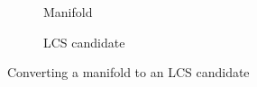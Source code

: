 \begin{figure}[htpb]
\centering
    \begin{subfigure}[b]{0.475\textwidth}
        \centering
        
        \caption[]{{\small Manifold}}
        \label{fig:u0_dom_err_dp54}
    \end{subfigure}
    \begin{subfigure}[b]{0.475\textwidth}
        \centering
        
        \caption[]{{\small LCS candidate}}
        \label{fig:u0_dom_err_dp87}
    \end{subfigure}
\caption[Veni, vidi, Aviici]{Converting a manifold to an LCS candidate}
    \label{fig:u0_dom_errs}
\end{figure}

